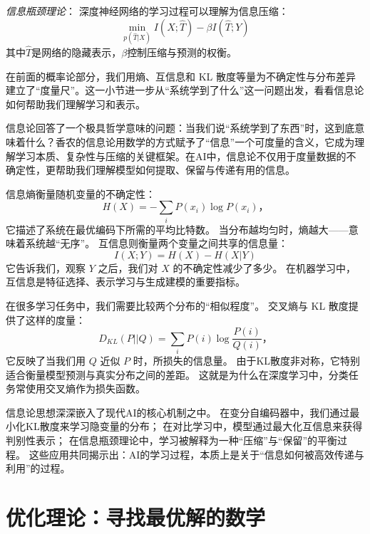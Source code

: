 


\textit{信息瓶颈理论}：
深度神经网络的学习过程可以理解为信息压缩：
$$\min_{p(\hat{T}|X)} I(X; \hat{T}) - \beta I(\hat{T}; Y)$$
其中$\hat{T}$是网络的隐藏表示，$\beta$控制压缩与预测的权衡。

在前面的概率论部分，我们用熵、互信息和 KL 散度等量为不确定性与分布差异建立了“度量尺”。这一小节进一步从“系统学到了什么”这一问题出发，看看信息论如何帮助我们理解学习和表示。


信息论回答了一个极具哲学意味的问题：当我们说“系统学到了东西”时，这到底意味着什么？香农的信息论用数学的方式赋予了“信息”一个可度量的含义，它成为理解学习本质、复杂性与压缩的关键框架。在AI中，信息论不仅用于度量数据的不确定性，更帮助我们理解模型如何提取、保留与传递有用的信息。

信息熵衡量随机变量的不确定性：
$$H(X) = -\sum_{i} P(x_i) \log P(x_i)，$$
它描述了系统在最优编码下所需的平均比特数。  
当分布越均匀时，熵越大——意味着系统越“无序”。  
互信息则衡量两个变量之间共享的信息量：
$$I(X;Y) = H(X) - H(X|Y)$$
它告诉我们，观察 $Y$ 之后，我们对 $X$ 的不确定性减少了多少。  
在机器学习中，互信息是特征选择、表示学习与生成建模的重要指标。

在很多学习任务中，我们需要比较两个分布的“相似程度”。  
交叉熵与 KL 散度提供了这样的度量：
$$ D_{KL}(P||Q) = \sum_i P(i)\log\frac{P(i)}{Q(i)}，$$
它反映了当我们用 $Q$ 近似 $P$ 时，所损失的信息量。  
由于KL散度非对称，它特别适合衡量模型预测与真实分布之间的差距。  
这就是为什么在深度学习中，分类任务常使用交叉熵作为损失函数。

信息论思想深深嵌入了现代AI的核心机制之中。  
在变分自编码器中，我们通过最小化KL散度来学习隐变量的分布；  
在对比学习中，模型通过最大化互信息来获得判别性表示；  
在信息瓶颈理论中，学习被解释为一种“压缩”与“保留”的平衡过程。  
这些应用共同揭示出：AI的学习过程，本质上是关于“信息如何被高效传递与利用”的过程。

\section{优化理论：寻找最优解的数学}

